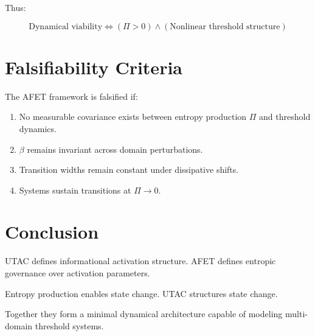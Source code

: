 \documentclass[12pt]{article}
\begin{document}
Thus:

\begin{equation}
\text{Dynamical viability} \iff
(\Pi > 0) \land (\text{Nonlinear threshold structure})
\end{equation}

\section{Falsifiability Criteria}

The AFET framework is falsified if:

\begin{enumerate}
\item No measurable covariance exists between entropy production $\Pi$ and threshold dynamics.
\item $\beta$ remains invariant across domain perturbations.
\item Transition widths remain constant under dissipative shifts.
\item Systems sustain transitions at $\Pi \to 0$.
\end{enumerate}

\section{Conclusion}

UTAC defines informational activation structure.
AFET defines entropic governance over activation parameters.

Entropy production enables state change.
UTAC structures state change.

Together they form a minimal dynamical architecture capable of modeling multi-domain threshold systems.
\end{document}
